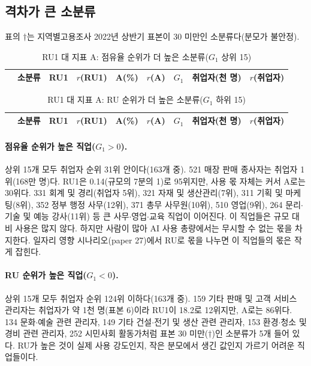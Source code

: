 \documentclass[11pt]{article}
\begin{document}
\subsection{격차가 큰 소분류}

표의 $\dagger$는 지역별고용조사 2022년 상반기 표본이 30 미만인 소분류다(분모가 불안정).

\begin{small}
\begin{longtable}{R{0.5cm}L{4.4cm}R{1.3cm}R{1.2cm}R{1.0cm}R{0.9cm}R{0.9cm}R{1.4cm}R{1.2cm}}
\caption{RU1 대 지표 A: 점유율 순위가 더 높은 소분류($G_1$ 상위 15)}\label{tab:g1pos}\\
\toprule
 & 소분류 & RU1 & $r$(RU1) & A(\%) & $r$(A) & $G_1$ & 취업자(천 명) & $r$(취업자) \\
\midrule
\endfirsthead

\bottomrule
\end{longtable}

\begin{longtable}{R{0.5cm}L{4.4cm}R{1.3cm}R{1.2cm}R{1.0cm}R{0.9cm}R{0.9cm}R{1.4cm}R{1.2cm}}
\caption{RU1 대 지표 A: RU 순위가 더 높은 소분류($G_1$ 하위 15)}\label{tab:g1neg}\\
\toprule
 & 소분류 & RU1 & $r$(RU1) & A(\%) & $r$(A) & $G_1$ & 취업자(천 명) & $r$(취업자) \\
\midrule
\endfirsthead

\bottomrule
\end{longtable}
\end{small}

\paragraph{점유율 순위가 높은 직업($G_1 > 0$).} 상위 15개 모두 취업자 순위 31위 안이다(163개 중). 521 매장 판매 종사자는 취업자 1위(168만 명)다. RU1은 0.14(규모의 7분의 1)로 95위지만, 사용 몫 자체는 커서 A로는 30위다. 331 회계 및 경리(취업자 5위), 321 자재 및 생산관리(7위), 311 기획 및 마케팅(8위), 352 정부 행정 사무(12위), 371 총무 사무원(10위), 510 영업(9위), 264 문리$\cdot$기술 및 예능 강사(11위) 등 큰 사무$\cdot$영업$\cdot$교육 직업이 이어진다. 이 직업들은 규모 대비 사용은 많지 않다. 하지만 사람이 많아 AI 사용 총량에서는 무시할 수 없는 몫을 차지한다. 일자리 영향 시나리오(paper 27)에서 RU로 몫을 나누면 이 직업들의 몫은 작게 잡힌다.

\paragraph{RU 순위가 높은 직업($G_1 < 0$).} 상위 15개 모두 취업자 순위 124위 이하다(163개 중). 159 기타 판매 및 고객 서비스 관리자는 취업자가 약 1천 명(표본 6)이라 RU1이 18.2로 12위지만, A로는 86위다. 134 문화$\cdot$예술 관련 관리자, 149 기타 건설$\cdot$전기 및 생산 관련 관리자, 153 환경$\cdot$청소 및 경비 관련 관리자, 252 시민사회 활동가처럼 표본 30 미만($\dagger$)인 소분류가 5개 들어 있다. RU가 높은 것이 실제 사용 강도인지, 작은 분모에서 생긴 값인지 가르기 어려운 직업들이다.
\end{document}
